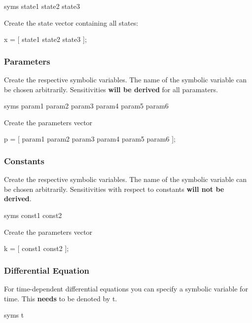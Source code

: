 \begin{DoxyCode}
syms state1 state2 state3 
\end{DoxyCode}


Create the state vector containing all states\+:


\begin{DoxyCode}
x = [ state1 state2 state3 ]; 
\end{DoxyCode}
\hypertarget{def_simu_parameters}{}\subsubsection{Parameters}\label{def_simu_parameters}
Create the respective symbolic variables. The name of the symbolic variable can be chosen arbitrarily. Sensitivities {\bfseries will be derived} for all paramaters.


\begin{DoxyCode}
syms param1 param2 param3 param4 param5 param6 
\end{DoxyCode}


Create the parameters vector


\begin{DoxyCode}
p = [ param1 param2 param3 param4 param5 param6 ]; 
\end{DoxyCode}
\hypertarget{def_simu_constants}{}\subsubsection{Constants}\label{def_simu_constants}
Create the respective symbolic variables. The name of the symbolic variable can be chosen arbitrarily. Sensitivities with respect to constants {\bfseries will not be derived}.


\begin{DoxyCode}
syms const1 const2 
\end{DoxyCode}


Create the parameters vector


\begin{DoxyCode}
k = [ const1 const2 ]; 
\end{DoxyCode}
\hypertarget{def_simu_rhs}{}\subsubsection{Differential Equation}\label{def_simu_rhs}
For time-\/dependent differential equations you can specify a symbolic variable for time. This {\bfseries needs} to be denoted by t.


\begin{DoxyCode}
syms t 
\end{DoxyCode}


